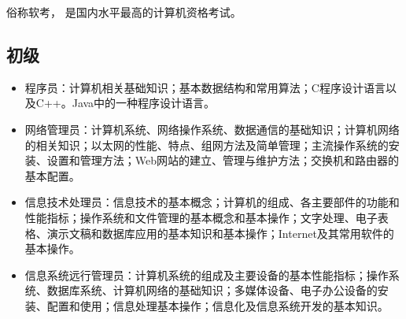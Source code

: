 
\begin{issues}
\issueDraft
\end{issues}

俗称软考， 是国内水平最高的计算机资格考试。

\subsection{初级}
\begin{itemize}
\item 程序员：计算机相关基础知识；基本数据结构和常用算法；C程序设计语言以及C++。Java中的一种程序设计语言。
\item 网络管理员：计算机系统、网络操作系统、数据通信的基础知识；计算机网络的相关知识；以太网的性能、特点、组网方法及简单管理；主流操作系统的安装、设置和管理方法；Web网站的建立、管理与维护方法；交换机和路由器的基本配置。
\item 信息技术处理员：信息技术的基本概念；计算机的组成、各主要部件的功能和性能指标；操作系统和文件管理的基本概念和基本操作；文字处理、电子表格、演示文稿和数据库应用的基本知识和基本操作；Internet及其常用软件的基本操作。
\item 信息系统远行管理员：计算机系统的组成及主要设备的基本性能指标；操作系统、数据库系统、计算机网络的基础知识；多媒体设备、电子办公设备的安装、配置和使用；信息处理基本操作；信息化及信息系统开发的基本知识。
\end{itemize}

